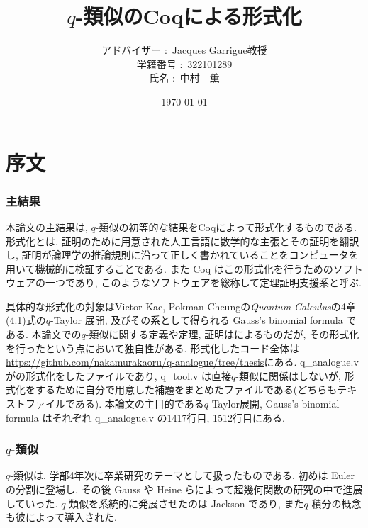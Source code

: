 \documentclass[11pt]{jsreport}
\theoremstyle{mystyle}
\newcommand{\0}{\textbf{0}}
\begin{document}
\title{$q$-類似のCoqによる形式化}
\author{アドバイザー $\colon$ Jacques Garrigue教授\\
           学籍番号 $\colon$ 322101289\\
           氏名 $\colon$ 中村　薫}
\date{\today}
\maketitle
\section*{序文}
\subsubsection*{主結果}
本論文の主結果は, $q$-類似の初等的な結果をCoqによって形式化するものである. 
形式化とは, 証明のために用意された人工言語に数学的な主張とその証明を翻訳し, 証明が論理学の推論規則に沿って正しく書かれていることをコンピュータを用いて機械的に検証することである.   また Coq はこの形式化を行うためのソフトウェアの一つであり, このようなソフトウェアを総称して定理証明支援系と呼ぶ.

具体的な形式化の対象はVictor Kac, Pokman Cheungの{\it Quantum Calculus}\cite{Kac}の4章(4.1)式の$q$-Taylor 展開, 及びその系として得られる Gauss's binomial formula である. 
本論文での$q$-類似に関する定義や定理, 証明は\cite{Kac}によるものだが, その形式化を行ったという点において独自性がある. 形式化したコード全体は\url{https://github.com/nakamurakaoru/q-analogue/tree/thesis}\cite{coq qana}にある. q\_analogue.v が\cite{Kac}の形式化をしたファイルであり, q\_tool.v は直接$q$-類似に関係はしないが, 形式化をするために自分で用意した補題をまとめたファイルである(どちらもテキストファイルである). 本論文の主目的である$q$-Taylor展開, Gauss's binomial formula はそれぞれ q\_analogue.v の1417行目, 1512行目にある. 
\subsubsection*{$q$-類似}
$q$-類似は, 学部4年次に卒業研究のテーマとして扱ったものである. 初めは Euler の分割に登場し, その後 Gauss や Heine らによって超幾何関数の研究の中で進展していった. $q$-類似を系統的に発展させたのは Jackson であり, また$q$-積分の概念も彼によって導入された. 
\end{document}
